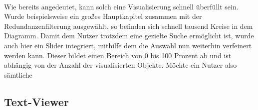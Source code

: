 \\
Wie bereits angedeutet, kann solch eine Visualisierung schnell \"uberf\"ullt sein. Wurde beispielsweise ein gro\"{\ss}es Hauptkapitel zusammen mit der Redundanzenfilterung ausgew\"ahlt, so befinden sich schnell tausend Kreise in dem Diagramm. Damit dem Nutzer trotzdem eine gezielte Suche erm\"oglicht ist, wurde auch hier ein Slider integriert, mithilfe dem die Auswahl nun weiterhin verfeinert werden kann. Dieser bildet einen Bereich von 0 bis 100 Prozent ab und ist abh\"angig von der Anzahl der visualisierten Objekte. M\"ochte ein Nutzer also s\"amtliche 

\subsection{Text-Viewer}